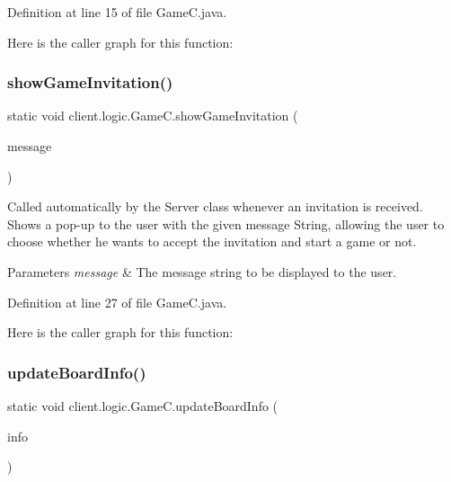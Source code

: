 Definition at line 15 of file Game\+C.\+java.

Here is the caller graph for this function\+:
\hypertarget{classclient_1_1logic_1_1_game_c_a62c530e593e489903a8ab6557763be27}{}\label{classclient_1_1logic_1_1_game_c_a62c530e593e489903a8ab6557763be27} 
\subsubsection{\texorpdfstring{show\+Game\+Invitation()}{showGameInvitation()}}
{\footnotesize\ttfamily static void client.\+logic.\+Game\+C.\+show\+Game\+Invitation (\begin{DoxyParamCaption}\item[{String}]{message }\end{DoxyParamCaption})\hspace{0.3cm}{\ttfamily [static]}}

Called automatically by the {\ttfamily Server} class whenever an invitation is received. Shows a pop-\/up to the user with the given message String, allowing the user to choose whether he wants to accept the invitation and start a game or not.


\begin{DoxyParams}{Parameters}
{\em message} & The message string to be displayed to the user. \\
\hline
\end{DoxyParams}


Definition at line 27 of file Game\+C.\+java.

Here is the caller graph for this function\+:
\hypertarget{classclient_1_1logic_1_1_game_c_a055e1c7cadc523d1c851af8856b0214d}{}\label{classclient_1_1logic_1_1_game_c_a055e1c7cadc523d1c851af8856b0214d} 
\subsubsection{\texorpdfstring{update\+Board\+Info()}{updateBoardInfo()}}
{\footnotesize\ttfamily static void client.\+logic.\+Game\+C.\+update\+Board\+Info (\begin{DoxyParamCaption}\item[{\hyperlink{classpt_1_1up_1_1fe_1_1lpro1613_1_1sharedlib_1_1tuples_1_1_board_u_i_info}{Board\+U\+I\+Info}}]{info }\end{DoxyParamCaption})\hspace{0.3cm}{\ttfamily [static]}}

